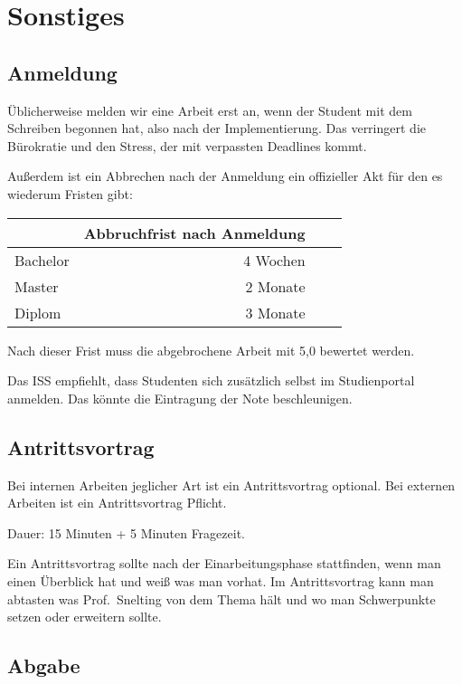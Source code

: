 \chapter{Sonstiges}

\section{Anmeldung}

Üblicherweise melden wir eine Arbeit erst an,
wenn der Student mit dem Schreiben begonnen hat,
also nach der Implementierung.
Das verringert die Bürokratie und den Stress,
der mit verpassten Deadlines kommt.

Außerdem ist ein Abbrechen nach der Anmeldung ein offizieller Akt
für den es wiederum Fristen gibt:

\begin{center}
\begin{tabular}{lrrr}
\toprule
 & Abbruchfrist nach Anmeldung \\
\midrule
Bachelor      & 4 Wochen \\
Master        & 2 Monate \\
Diplom        & 3 Monate \\
\bottomrule
\end{tabular}
\end{center}

Nach dieser Frist muss die abgebrochene Arbeit mit 5,0 bewertet werden.

Das ISS empfiehlt, dass Studenten sich zusätzlich selbst im Studienportal anmelden.
Das könnte die Eintragung der Note beschleunigen.

\section{Antrittsvortrag}

Bei internen Arbeiten jeglicher Art ist ein Antrittsvortrag optional.
Bei externen Arbeiten ist ein Antrittsvortrag Pflicht.

Dauer: 15 Minuten + 5 Minuten Fragezeit.

Ein Antrittsvortrag sollte nach der Einarbeitungsphase stattfinden,
wenn man einen Überblick hat und weiß was man vorhat.
Im Antrittsvortrag kann man abtasten was Prof.~Snelting von dem Thema hält
und wo man Schwerpunkte setzen oder erweitern sollte.

\section{Abgabe}

